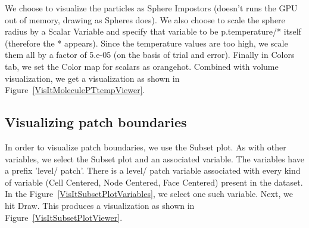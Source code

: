 We choose to visualize the particles as Sphere Impostors (doesn't runs
the GPU out of memory, drawing as Spheres does). We also choose to
scale the sphere radius by a Scalar Variable and specify that variable
to be p.temperature/* itself (therefore the * appears). Since the
temperature values are too high, we scale them all by a factor of
5.e-05 (on the basis of trial and error). Finally in Colors tab, we
set the Color map for scalars as orangehot.  Combined with volume
visualization, we get a visualization as shown in
Figure~\ref{VisItMoleculePTtempViewer}.


\subsection{Visualizing patch boundaries}
In order to visualize patch boundaries, we use the Subset plot. As
with other variables, we select the Subset plot and an associated
variable. The variables have a prefix 'level/ patch'. There is a
level/ patch variable associated with every kind of variable (Cell
Centered, Node Centered, Face Centered) present in the dataset. In the
Figure~\ref{VisItSubsetPlotVariables}, we select one such variable.
Next, we hit Draw. This produces a visualization as shown in
Figure~\ref{VisItSubsetPlotViewer}.



